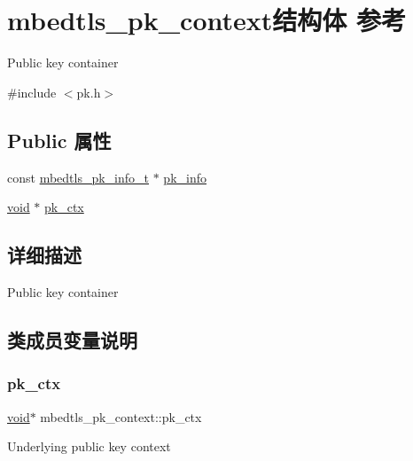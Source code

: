 \hypertarget{structmbedtls__pk__context}{}\section{mbedtls\+\_\+pk\+\_\+context结构体 参考}
\label{structmbedtls__pk__context}


Public key container  




{\ttfamily \#include $<$pk.\+h$>$}

\subsection*{Public 属性}
\begin{DoxyCompactItemize}
\item 
const \hyperlink{structmbedtls__pk__info__t}{mbedtls\+\_\+pk\+\_\+info\+\_\+t} $\ast$ \hyperlink{structmbedtls__pk__context_a3dac25bf08a411a2479107e14fa90550}{pk\+\_\+info}
\item 
\hyperlink{interfacevoid}{void} $\ast$ \hyperlink{structmbedtls__pk__context_aa6a3a0dbdf30848261eaf687a6368af4}{pk\+\_\+ctx}
\end{DoxyCompactItemize}


\subsection{详细描述}
Public key container 

\subsection{类成员变量说明}
\mbox{\label{structmbedtls__pk__context_aa6a3a0dbdf30848261eaf687a6368af4}} 
\subsubsection{\texorpdfstring{pk\+\_\+ctx}{pk\_ctx}}
{\footnotesize\ttfamily \hyperlink{interfacevoid}{void}$\ast$ mbedtls\+\_\+pk\+\_\+context\+::pk\+\_\+ctx}

Underlying public key context \mbox{\label{structmbedtls__pk__context_a3dac25bf08a411a2479107e14fa90550}} 
